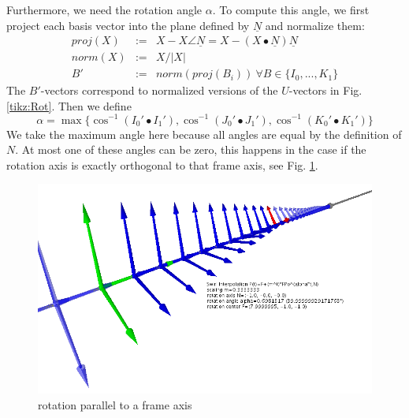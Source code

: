\documentclass[journal, letterpaper]{IEEEtran}
\begin{document}
Furthermore, we need the rotation angle $\alpha$. To compute this angle, we first project each basis vector into the plane defined by $\underline{N}$ and normalize them:
\begin{equation}
\begin{array}{lcl}
 proj(X) &:=& X - X\angle\underline{N} = X - (X \bullet \underline{N})\underline{N} \\
 norm(X) &:=& X / |X| \\
 B' &:=& norm(proj(B_i)) \ \forall B \in \{I_0,...,K_1\}
\end{array}
\label{eq:ProjBasis}
\end{equation}
The $B'$-vectors correspond to normalized versions of the $U$-vectors in Fig. \ref{tikz:Rot}.
Then we define
\begin{equation}
 \alpha = \max \{ \cos^{-1}(I_0' \bullet I_1'), \cos^{-1}(J_0' \bullet J_1'), \cos^{-1}(K_0' \bullet K_1') \}
\label{eq:}
\end{equation}
We take the maximum angle here because all angles are equal by the definition of $N$. At most one of these angles can be zero, this happens in the case if the rotation axis is exactly orthogonal to that frame axis, see Fig. \ref{fig:P1}.
\begin{figure}
	\centering
		\includegraphics[scale=0.4]{pictures/P1.png}
	\caption{rotation parallel to a frame axis}
	\label{fig:P1}
\end{figure}
\end{document}
